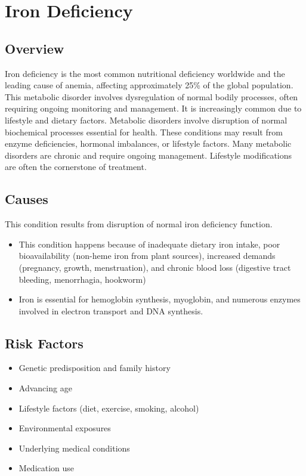 \chapter{Iron Deficiency}
\label{sec:Iron Deficiency}

\section{Overview}
Iron deficiency is the most common nutritional deficiency worldwide and the leading cause of anemia, affecting approximately 25\% of the global population. This metabolic disorder involves dysregulation of normal bodily processes, often requiring ongoing monitoring and management. It is increasingly common due to lifestyle and dietary factors. Metabolic disorders involve disruption of normal biochemical processes essential for health. These conditions may result from enzyme deficiencies, hormonal imbalances, or lifestyle factors. Many metabolic disorders are chronic and require ongoing management. Lifestyle modifications are often the cornerstone of treatment.
\section{Causes}
This condition results from disruption of normal iron deficiency function.

\begin{itemize}[noitemsep]
  \item This condition happens because of inadequate dietary iron intake, poor bioavailability (non-heme iron from plant sources), increased demands (pregnancy, growth, menstruation), and chronic blood loss (digestive tract bleeding, menorrhagia, hookworm)
  \item Iron is essential for hemoglobin synthesis, myoglobin, and numerous enzymes involved in electron transport and DNA synthesis.
\end{itemize}
\section{Risk Factors}
\begin{itemize}[noitemsep]
  \item Genetic predisposition and family history
  \item Advancing age
  \item Lifestyle factors (diet, exercise, smoking, alcohol)
  \item Environmental exposures
  \item Underlying medical conditions
  \item Medication use
\end{itemize}
